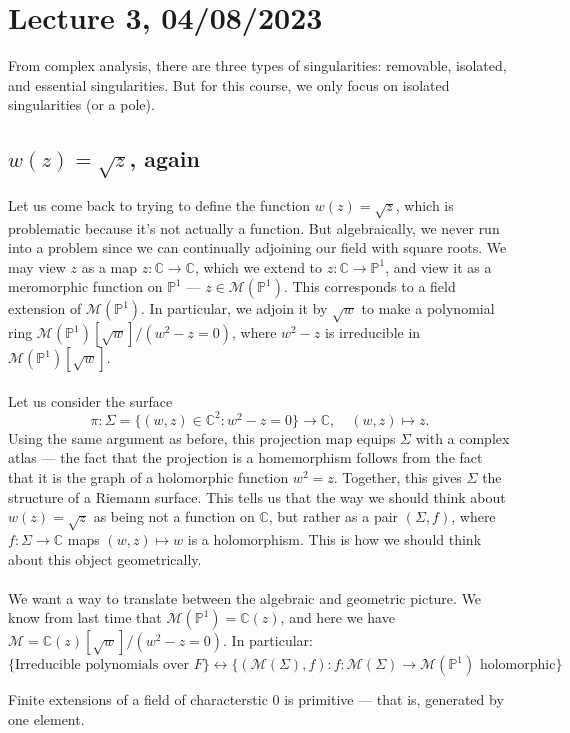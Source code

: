 \documentclass[a4paper]{report}
\theoremstyle{definition}
\theoremstyle{remark}
\theoremstyle{proposition}
\theoremstyle{conjecture}
\theoremstyle{lemma}
\theoremstyle{corollary}
\theoremstyle{exercise}
\theoremstyle{example}
\newcommand{\C}{\mathbb{C}}
\newcommand{\mcal}{\mathcal}
\begin{document}
\section{Lecture 3, 04/08/2023}

From complex analysis, there are three types of singularities: 
removable, isolated, and essential singularities. 
But for this course, we only focus on isolated singularities (or a pole). 
\subsection{$w(z) = \sqrt{z}$, again}
Let us come back to trying to define the function $w(z) = \sqrt{z}$, which is 
problematic because it's not actually a function. But algebraically, we never 
run into a problem since we can continually adjoining our field with 
square roots. We may view $z$ as a map $z : \C \to \C$, which we 
extend to $z: \C \to \mathbb{P}^1$, and view it as a meromorphic function 
on $\mathbb{P}^1$ --- $z\in \mcal{M}(\mathbb{P}^1)$. This corresponds
to a field extension of $\mcal{M}(\mathbb{P}^1)$. In particular, we adjoin
it by $\sqrt{w}$ to make a polynomial ring 
$\mcal{M}(\mathbb{P}^1)[\sqrt{w}]/(w^2-z=0)$, where 
$w^2-z$ is irreducible in $\mcal{M}(\mathbb{P}^1)[\sqrt{w}]$.\\\\
Let us consider the surface $$\pi : \Sigma = \lbrace (w,z) \in \C^2 : w^2-z = 0\rbrace \longrightarrow \C,\quad (w,z) \longmapsto z.$$
Using the same argument as before, this projection map equips $\Sigma$ with
a complex atlas --- the fact that the projection is a homemorphism follows 
from the fact that it is the graph of a holomorphic function $w^2 =z$.
Together, this gives $\Sigma$ the structure of a Riemann surface.
This tells us that the way we should think about $w(z)=\sqrt{z}$ as being 
not a function on $\C$, but rather as a pair $(\Sigma, f)$, 
where $f: \Sigma \to \C$ maps $(w,z)\mapsto w$ is a holomorphism. 
This is how we should think about this object geometrically.\\\\
We want a way to translate between the algebraic and geometric picture.
We know from last time that $\mcal{M}(\mathbb{P}^1) = \C(z)$, and here we have 
$\mcal{M} = \C(z)[\sqrt{w}]/(w^2-z=0)$.
In particular:
$$\lbrace \text{Irreducible polynomials over $F$}\rbrace \longleftrightarrow \lbrace (\mcal{M}(\Sigma),f) : \text{$f : \mcal{M}(\Sigma)\to \mcal{M}(\mathbb{P}^1)$ holomorphic}\rbrace$$

\begin{theorem}
    Finite extensions of a field of characterstic $0$ is primitive --- that is,
    generated by one element. 
\end{theorem}
\end{document}
